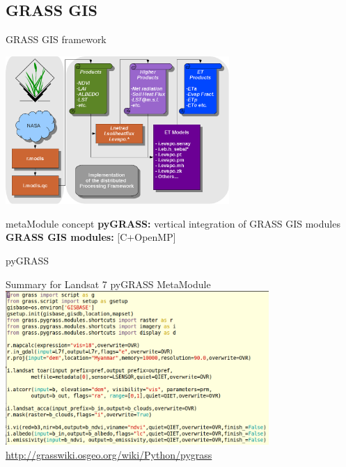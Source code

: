 \documentclass[xcolor=dvipsnames,beamer]{beamer} %
\begin{document}
\subsection{GRASS GIS}
\begin{frame}[fragile]{GRASS GIS framework}

\begin{center}
 \includegraphics[width=8.5cm]{architecture_implementation}
\end{center}

\begin{block}{metaModule concept}
{\bf pyGRASS:} vertical integration of GRASS GIS modules\\
{\bf GRASS GIS modules:} [C+OpenMP]
\end{block}

\end{frame}

\begin{frame}[fragile]{pyGRASS}

\begin{center}
 Summary for Landsat 7 pyGRASS MetaModule
 \includegraphics[width=10cm]{pyGRASS1}\\
 \href{http://grasswiki.osgeo.org/wiki/Python/pygrass}{http://grasswiki.osgeo.org/wiki/Python/pygrass}
\end{center}

\end{frame}
\end{document}
